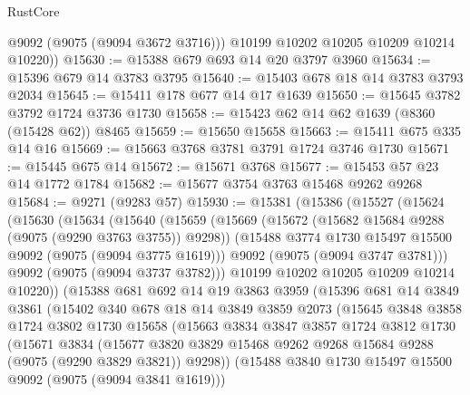 \begin{lexlean}{RustCore}
\begin{coremodule}
          @9092
          (@9075 (@9094 @3672 @3716)))
        @10199
        @10202
        @10205
        @10209
        @10214
        @10220))
@15630 := @15388 @679 @693 @14 @20 @3797 @3960
@15634 := @15396 @679 @14 @3783 @3795
@15640 := @15403 @678 @18 @14 @3783 @3793 @2034
@15645 := @15411 @178 @677 @14 @17 @1639
@15650 := @15645 @3782 @3792 @1724 @3736 @1730
@15658 := @15423 @62 @14 @62 @1639 (@8360 (@15428 @62)) @8465
@15659 := @15650 @15658
@15663 := @15411 @675 @335 @14 @16
@15669 := @15663 @3768 @3781 @3791 @1724 @3746 @1730
@15671 := @15445 @675 @14
@15672 := @15671 @3768
@15677 := @15453 @57 @23 @14 @1772 @1784
@15682 := @15677 @3754 @3763 @15468 @9262 @9268
@15684 := @9271 (@9283 @57)
@15930 := @15381
    (@15386
      (@15527
        (@15624
          (@15630
            (@15634
              (@15640
                (@15659
                  (@15669
                    (@15672 (@15682 @15684 @9288 (@9075 (@9290 @3763 @3755)) @9298))
                    (@15488 @3774 @1730 @15497 @15500 @9092 (@9075 (@9094 @3775 @1619)))
                    @9092
                    (@9075 (@9094 @3747 @3781)))
                  @9092
                  (@9075 (@9094 @3737 @3782)))
                @10199
                @10202
                @10205
                @10209
                @10214
                @10220))
            (@15388
              @681
              @692
              @14
              @19
              @3863
              @3959
              (@15396
                @681
                @14
                @3849
                @3861
                (@15402
                  @340
                  @678
                  @18
                  @14
                  @3849
                  @3859
                  @2073
                  (@15645
                    @3848
                    @3858
                    @1724
                    @3802
                    @1730
                    @15658
                    (@15663
                      @3834
                      @3847
                      @3857
                      @1724
                      @3812
                      @1730
                      (@15671
                        @3834
                        (@15677
                          @3820
                          @3829
                          @15468
                          @9262
                          @9268
                          @15684
                          @9288
                          (@9075 (@9290 @3829 @3821))
                          @9298))
                      (@15488 @3840 @1730 @15497 @15500 @9092 (@9075 (@9094 @3841 @1619)))

\end{coremodule}
\end{lexlean}
